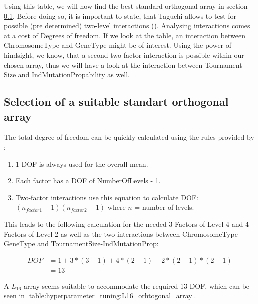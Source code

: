 Using this table, we will now find the best standard orthogonal array in section \ref{chap:hyperparameter_tuning:selection_orthogonal_array}. Before doing so, it is important to state, that Taguchi allows to test for possible (pre determined) two-level interactions (\cite{yang_design_2009}). Analysing interactions comes at a cost of Degrees of freedom. If we look at the table, an interaction between ChromosomeType and GeneType might be of interest. Using the power of hindsight, we know, that a second two factor interaction is possible within our chosen array, thus we will have a look at the interaction between Tournament Size and IndMutationPropability as well.


\subsection{Selection of a suitable standart orthogonal array}
\label{chap:hyperparameter_tuning:selection_orthogonal_array}
The total degree of freedom can be quickly calculated using the rules provided by \cite{yang_design_2009}:

\begin{enumerate}
	\item 1 DOF is always used for the overall mean. 
	\item Each factor has a DOF of NumberOfLevels - 1.
	\item Two-factor interactions use this equation to calculate DOF: $(n_{factor1} - 1)(n_{factor2} - 1)$ where $n$ = number of levels.
\end{enumerate}


This leads to the following calculation for the needed 3 Factors of Level 4 and 4 Factors of Level 2 as well as the two interactions between ChromosomeType-GeneType and TournamentSize-IndMutationProp:

\begin{equation} \label{DOF}
	\begin{split}
		DOF & = 1 + 3 * (3 - 1) + 4 * (2 - 1) + 2 * (2 - 1) * (2 - 1) \\
		& = 13
	\end{split}
\end{equation}

A $L_{16}$ array seems suitable to accommodate the required 13 DOF, which can be seen in \ref{table:hyperparameter_tuning:L16_orhtogonal_array}.


